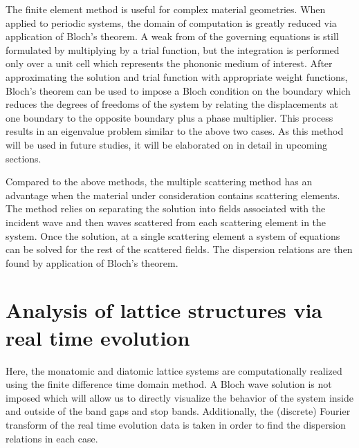 \documentclass{article}
\begin{document}
The finite element method is useful for complex material geometries. When 
applied to periodic systems, the domain of computation is greatly reduced via 
application of Bloch's theorem. A weak from of the governing equations is still 
formulated by multiplying by a trial function, but the integration is performed 
only over a unit cell which represents the phononic medium of interest. After 
approximating the solution and trial function with appropriate weight 
functions, Bloch's theorem can be used to impose a Bloch condition on the 
boundary which reduces the degrees of freedoms of the system by relating the 
displacements at one boundary to the opposite boundary plus a phase multiplier.
This process results in an eigenvalue problem similar to the above two cases. 
As this method will be used in future studies, it will be elaborated on in 
detail in upcoming sections.

Compared to the above methods, the multiple scattering method has an advantage 
when the material under consideration contains scattering elements. The method 
relies on separating the solution into fields associated with the incident wave 
and then waves scattered from each scattering element in the system. Once the 
solution, at a single scattering element a system of equations can be solved 
for the rest of the scattered fields. The dispersion relations are then found 
by application of Bloch's theorem. 

\section{Analysis of lattice structures via real time evolution}
Here, the monatomic and diatomic lattice systems are computationally realized
using the finite difference time domain method. A Bloch wave solution is not 
imposed which will allow us to directly visualize the behavior of the 
system inside and outside of the band gaps and stop bands. Additionally, the 
(discrete) Fourier transform of the real time evolution data is taken in order 
to find the dispersion relations in each case. 
\end{document}
